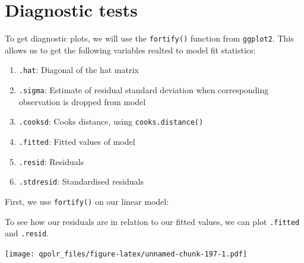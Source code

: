 \documentclass[12pt,oneside]{reedthesis}
\providecommand{\tightlist}{%
  \setlength{\itemsep}{0pt}\setlength{\parskip}{0pt}}
\theoremstyle{definition}
\theoremstyle{definition}
\theoremstyle{definition}
\theoremstyle{remark}
\begin{document}
  \section{Diagnostic tests}\label{diagnostic-tests}
  
  To get diagnostic plots, we will use the \texttt{fortify()} function
  from \texttt{ggplot2}. This allows us to get the following variables
  realted to model fit statistics:
  \begin{enumerate}
  \def\labelenumi{\arabic{enumi}.}
  \tightlist
  \item
    \texttt{.hat}: Diagonal of the hat matrix
  \item
    \texttt{.sigma}: Estimate of residual standard deviation when
    corresponding observation is dropped from model
  \item
    \texttt{.cooksd}: Cooks distance, using \texttt{cooks.distance()}
  \item
    \texttt{.fitted}: Fitted values of model
  \item
    \texttt{.resid}: Residuals
  \item
    \texttt{.stdresid}: Standardised residuals
  \end{enumerate}
  First, we use \texttt{fortify()} on our linear model:
  \begin{Shaded}
  \begin{Highlighting}[]
  \StringTok{ }
  \end{Highlighting}
  \end{Shaded}
  To see how our residuals are in relation to our fitted values, we can
  plot \texttt{.fitted} and \texttt{.resid}.
  \begin{Shaded}
  \begin{Highlighting}[]
  \NormalTok{(}\OperatorTok{+}
  \StringTok{  }\NormalTok{() }\OperatorTok{+}
  \StringTok{  }\NormalTok{(} \NormalTok{) }\OperatorTok{+}
  \StringTok{  }\NormalTok{(} \NormalTok{) }\OperatorTok{+}
  \StringTok{  }\NormalTok{(} \NormalTok{,}
          \NormalTok{,}
          \NormalTok{)}
  \end{Highlighting}
  \end{Shaded}
  \texttt{[image: qpolr\_files/figure-latex/unnamed-chunk-197-1.pdf]}
  
\end{document}
